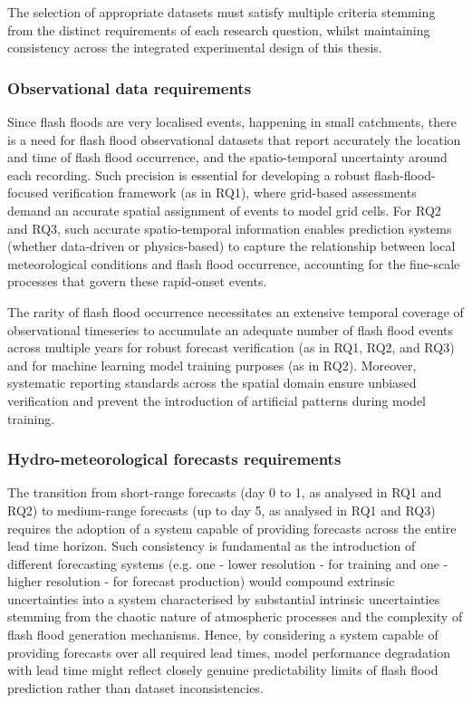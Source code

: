 The selection of appropriate datasets must satisfy multiple criteria stemming from the distinct requirements of each research question, whilst maintaining consistency across the integrated experimental design of this thesis.

\subsubsection{Observational data requirements}

Since  flash floods are very localised events, happening in small catchments, there is a need for flash flood observational datasets that report accurately the location and time of flash flood occurrence, and the spatio-temporal uncertainty around each recording. Such precision is essential for developing a robust flash-flood-focused verification framework (as in RQ1), where grid-based assessments demand an accurate spatial assignment of events to model grid cells. For RQ2 and RQ3, such accurate spatio-temporal information enables prediction systems (whether data-driven or physics-based) to capture the relationship between local meteorological conditions and flash flood occurrence, accounting for the fine-scale processes that govern these rapid-onset events.

The  rarity of flash flood occurrence necessitates an extensive temporal coverage of observational timeseries to accumulate an adequate number of flash flood events across multiple years for robust forecast verification (as in RQ1, RQ2, and RQ3) and for machine learning model training purposes (as in RQ2). Moreover, systematic reporting standards across the spatial domain ensure unbiased verification and prevent the introduction of artificial patterns during model training.

\subsubsection{Hydro-meteorological forecasts requirements}

The  transition from short-range forecasts (day 0 to 1, as analysed in RQ1 and RQ2) to medium-range forecasts (up to day 5, as analysed in RQ1 and RQ3) requires the adoption of a system capable of providing forecasts across the entire lead time horizon. Such consistency is fundamental as the introduction of different forecasting systems (e.g. one - lower resolution - for training and one - higher resolution - for forecast production) would compound extrinsic uncertainties into a system characterised by substantial intrinsic uncertainties stemming from the chaotic nature of atmospheric processes and the complexity of flash flood generation mechanisms. Hence, by considering a system capable of providing forecasts over all required lead times, model performance degradation with lead time might reflect closely genuine predictability limits of flash flood prediction rather than dataset inconsistencies.

